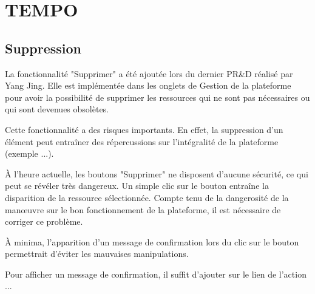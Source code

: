 \documentclass{polytech/polytech}
\begin{document}
\chapter{TEMPO}

\section*{Suppression}

La fonctionnalité "Supprimer" a été ajoutée lors du dernier PR\&D réalisé par Yang Jing. Elle est implémentée dans les onglets de Gestion de la plateforme pour avoir la possibilité de supprimer les ressources qui ne sont pas nécessaires ou qui sont devenues obsolètes.  

Cette fonctionnalité a des risques importants. En effet, la suppression d'un élément peut entraîner des répercussions sur l'intégralité de la plateforme (exemple ...). 

À l'heure actuelle, les boutons "Supprimer" ne disposent d'aucune sécurité, ce qui peut se révéler très dangereux. Un simple clic sur le bouton entraîne la disparition de la ressource sélectionnée. Compte tenu de la dangerosité de la manœuvre sur le bon fonctionnement de la plateforme, il est nécessaire de corriger ce problème. 

À minima, l'apparition d'un message de confirmation lors du clic sur le bouton permettrait d'éviter les mauvaises manipulations. 

Pour afficher un message de confirmation, il suffit d'ajouter  sur le lien de l'action ...
\end{document}
